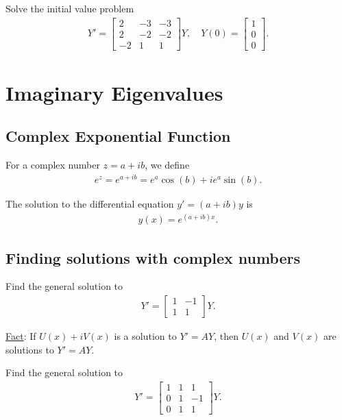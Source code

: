 \documentclass[12pt,a4paper]{article}
\newcounter{example}[section]
\begin{document}
	\begin{example}
	Solve the initial value problem
		\begin{align*}
		Y' = \begin{bmatrix}
		2 & -3 & -3 \\
		2 & -2 & -2 \\
		-2 & 1 & 1
		\end{bmatrix}Y , \quad Y(0) = \begin{bmatrix}
		1 \\ 0 \\ 0
		\end{bmatrix} .
		\end{align*}
	\end{example}
	
	\newpage
	
\section{Imaginary Eigenvalues}

	\subsection{Complex Exponential Function}
	For a complex number $z = a + ib$, we define
		\begin{align*}
		e^z = e^{a + ib} = e^a \cos (b) + i e^a \sin (b) .
		\end{align*}
		
	The solution to the differential equation $y' = (a + ib) y$ is
		\begin{align*}
		y (x) = e^{(a + ib)x} .
		\end{align*}
	
	\subsection{Finding solutions with complex numbers}
	
	\begin{example}
	Find the general solution to 
		\begin{align*}
		Y' = \begin{bmatrix}
		1 & -1 \\ 1 & 1
		\end{bmatrix} Y.
		\end{align*}
	\end{example}
	
	\vfill
	
	\underline{Fact}: If $U(x) + i V(x)$ is a solution to $Y' = A Y$, then $U(x)$ and $V(x)$ are solutions to $Y' = A Y$.
	
	\newpage
	
	\begin{example}
	Find the general solution to
		\begin{align*}
		Y' = \begin{bmatrix}
		1 & 1 & 1 \\
		0 & 1 & -1 \\
		0 & 1 & 1
		\end{bmatrix} Y.
		\end{align*}
	\end{example}
\end{document}
